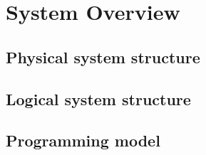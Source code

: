 \chapter{System Overview}

\section{Physical system structure}

\section{Logical system structure}

\section{Programming model}
